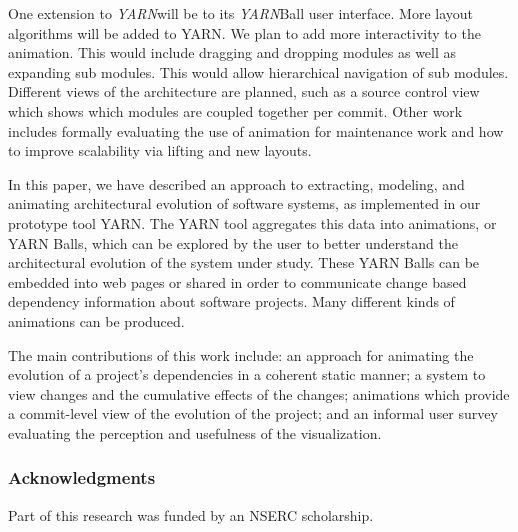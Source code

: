 \documentclass[times, 10pt,twocolumn]{article}
\newcommand{\yarn}{\emph{YARN\xspace}}
\newcommand{\YARN}{\yarn}
\newcommand{\shtn}{\vspace*{-.5em}}
\begin{document}







\shtn
{}
\shtn


One extension to \YARN will be to its \YARN Ball user interface.  More
layout algorithms will be added to YARN.  We plan to add more
interactivity to the animation. This would include dragging and
dropping modules as well as expanding sub modules.  This would allow
hierarchical navigation of sub modules.  Different views of the
architecture are planned, such as a source control view which shows
which modules are coupled together per commit.  Other work includes
formally evaluating the use of animation for maintenance work and how
to improve scalability via lifting and new layouts.


\shtn
{}
\shtn


In this paper, we have described an approach to extracting, modeling,
and animating architectural evolution of software systems, as
implemented in our prototype tool YARN.  The YARN tool aggregates this
data into animations, or YARN Balls, which can be explored by the user
to better understand the architectural evolution of the system under
study.  These YARN Balls can be embedded into web pages or shared in
order to communicate change based dependency information about
software projects.  Many different kinds of animations can be
produced.

The main contributions of this work include: an approach for
animating the evolution of a project's dependencies in a coherent
static manner; a system to view changes and the cumulative effects of
the changes; animations which provide a commit-level view of the
evolution of the project; and an informal user survey evaluating the
perception and usefulness of the visualization.

\shtn
\shtn
\subsubsection*{Acknowledgments} 
\shtn
Part of this research was funded
by an NSERC scholarship.
\end{document}
